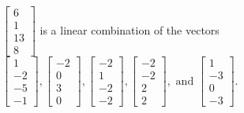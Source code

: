 \begin{exercise}
\begin{exerciseStatement}
  \end{exerciseStatement}
  \begin{exerciseAnswer}
   \(\left[\begin{array}{c}
6 \\
1 \\
13 \\
8
\end{array}\right]\) 
  	 is  
	a linear combination of the vectors \(\left[\begin{array}{c}
1 \\
-2 \\
-5 \\
-1
\end{array}\right] , \left[\begin{array}{c}
-2 \\
0 \\
3 \\
0
\end{array}\right] , \left[\begin{array}{c}
-2 \\
1 \\
-2 \\
-2
\end{array}\right] , \left[\begin{array}{c}
-2 \\
-2 \\
2 \\
2
\end{array}\right] , \text{ and } \left[\begin{array}{c}
1 \\
-3 \\
0 \\
-3
\end{array}\right]\).

	
  


  \end{exerciseAnswer}
\end{exercise}